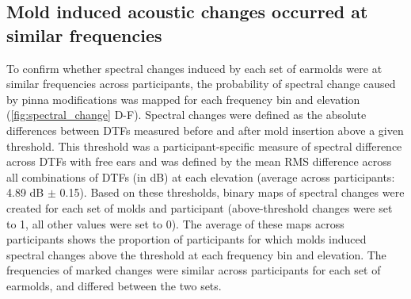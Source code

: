 \subsection{Mold induced acoustic changes occurred at similar frequencies}

 
To confirm whether spectral changes induced by each set of earmolds were at similar frequencies across participants, the probability of spectral change caused by pinna modifications was mapped for each frequency bin and elevation (\cref{fig:spectral_change} D-F). Spectral changes were defined as the absolute differences between DTFs measured before and after mold insertion above a given threshold. This threshold was a participant-specific measure of spectral difference across DTFs with free ears and was defined by the mean RMS difference across all combinations of DTFs (in dB) at each elevation (average across participants: 4.89 dB $\pm$ 0.15). Based on these thresholds, binary maps of spectral changes were created for each set of molds and participant (above-threshold changes were set to 1, all other values were set to 0). The average of these maps across participants shows the proportion of participants for which molds induced spectral changes above the threshold at each frequency bin and elevation. The frequencies of marked changes were similar across participants for each set of earmolds, and differed between the two sets.



